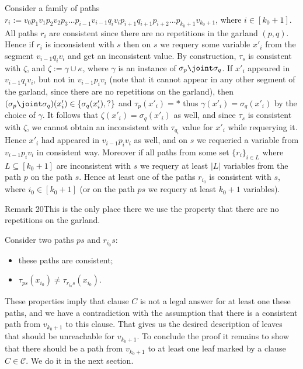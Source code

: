 Consider a family of paths $r_i:=v_0p_1v_1p_2v_2p_3\ldots p_{i-1}v_{i-1}q_iv_ip_{i+1}q_{i+1}p_{i+2}\ldots p_{k_0+1}v_{k_0+1}$, where $i\in[k_0+1]$. All paths $r_i$ are consistent since there are no repetitions in the garland $(p,q)$. Hence if $r_i$ is inconsistent with $s$ then on $s$ we requery some variable $x'_i$ from the segment $v_{i-1}q_iv_i$ and get an inconsistent value.
By construction, $\tau_s$ is consistent with $\zeta$, and $\zeta:=\gamma\cup\kappa$, where $\gamma$ is an instance of $\sigma_p\joint\sigma_q$. If $x'_i$ appeared in $v_{i-1}q_iv_i$, but not in $v_{i-1}p_iv_i$ (note that it cannot appear in any other segment of the garland, since there are no repetitions on the garland), then $(\sigma_p\joint\sigma_q)(x'_i)\in\{\sigma_q(x'_i),?\}$ and $\tau_p(x'_i)=*$ thus $\gamma(x'_i)=\sigma_q(x'_i)$ by the choice of $\gamma$. It follows that $\zeta(x'_i)=\sigma_q(x'_i)$ as well, and since $\tau_s$ is consistent with $\zeta$, we cannot obtain an inconsistent with $\tau_{q_i}$ value for $x'_i$ while requerying it. Hence $x'_i$ had appeared in $v_{i-1}p_iv_i$ as well, and on $s$ we requeried a variable from $v_{i-1}p_iv_i$ in consistent way. Moreover if all paths from some set $\{r_i\}_{i\in L}$ where $L\subseteq[k_0+1]$ are inconsistent with $s$ we requery at least $|L|$ variables from the path $p$ on the path $s$. Hence at least one of the paths $r_{i_0}$ is consistent with $s$, where $i_0\in[k_0+1]$ (or on the path $ps$ we requery at least $k_0+1$ variables).
\begin{result}{Remark 20}This is the only place there we use the property that there are no repetitions on the garland.\end{result}
Consider two paths $ps$ and $r_{i_0}s$:
\begin{itemize}\item these paths are consistent;
\item $\tau_{ps}(x_{i_0})\ne\tau_{r_{i_0}s}(x_{i_0})$.\end{itemize}
These properties imply that clause $C$ is not a legal answer for at least one these paths, and we have a contradiction with the assumption that there is a consistent path from $v_{k_0+1}$ to this clause. That gives us the desired description of leaves that should be unreachable for $v_{k_0+1}$.
To conclude the proof it remains to show that there should be a path from $v_{k_0+1}$ to at least one leaf marked by a clause $C\in\mathcal C$. We do it in the next section.
